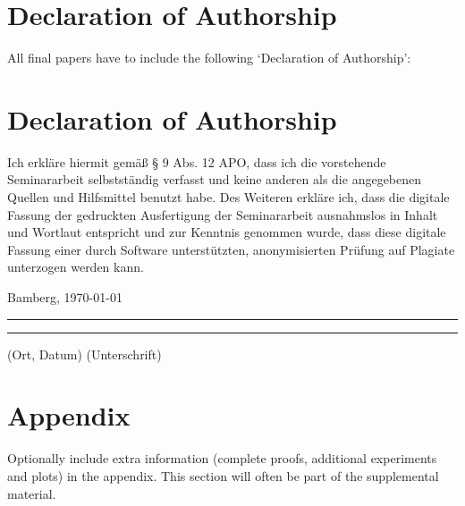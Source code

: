 \documentclass[a4paper]{article}
\begin{document}

\section*{Declaration of Authorship}
All final papers have to include the following ‘Declaration of Authorship’:

{\parindent 0cm
\section*{Declaration of Authorship}
Ich erkläre hiermit gemäß § 9 Abs. 12 APO, dass ich die vorstehende Seminararbeit selbstständig verfasst und keine anderen als die angegebenen Quellen und Hilfsmittel benutzt habe. Des Weiteren erkläre ich, dass die digitale Fassung der gedruckten Ausfertigung der Seminararbeit ausnahmslos in Inhalt und Wortlaut entspricht und zur Kenntnis genommen wurde, dass diese digitale Fassung einer durch Software unterstützten, anonymisierten Prüfung auf Plagiate unterzogen werden kann.\\
\vspace{2\baselineskip}
  
Bamberg, \today

\rule[0.5em]{14em}{0.5pt} \hspace{0.25\linewidth}\rule[0.5em]{14em}{0.5pt}
\vspace{1em}
\hspace{4em} (Ort, Datum) \hspace{0.51\linewidth} (Unterschrift)
}







\appendix


\section{Appendix}


Optionally include extra information (complete proofs, additional experiments and plots) in the appendix.
This section will often be part of the supplemental material.
\end{document}

